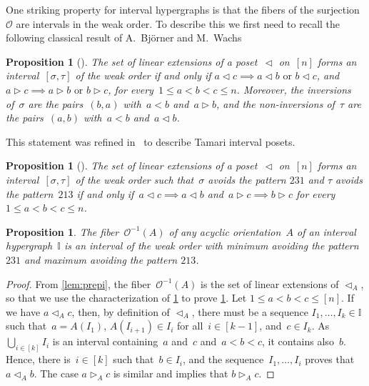 \documentclass[reqno]{amsart}
\newtheorem{proposition}[theorem]{Proposition}
\theoremstyle{definition}
\newcommand{\less}{\vartriangleleft} %
\newcommand{\more}{\vartriangleright} %
\newcommand{\Or}{\mathcal O}  %
\newcommand{\II}{\mathbb I} %
\begin{document}
One striking property for interval hypergraphs is that the fibers of the surjection~$\Or$ are intervals in the weak order.
To describe this we first need to recall the following classical result of A.~Bj\"orner and M.~Wachs~\cite[Thm.~6.8]{BjornerWachs}

\begin{proposition}[{\cite[Thm.~6.8]{BjornerWachs}}]
\label{prop:WOIP}
The set of linear extensions of a poset~$\less$ on~$[n]$ forms an interval~$[\sigma, \tau]$ of the weak order if and only if ${a \less c \implies a \less b \text{ or } b \less c}$, and~${a \more c \implies a \more b \text{ or } b \more c}$, for every~$1 \le a < b < c \le n$.
Moreover, the inversions of~$\sigma$ are the pairs~$(b,a)$ with~$a < b$ and~$a \more b$, and the non-inversions of~$\tau$ are the pairs~$(a,b)$ with~$a < b$ and~$a \less b$.
\end{proposition}

This statement was refined in~\cite{ChatelPilaudPons} to describe Tamari interval posets.

\begin{proposition}[{\cite[Coro.~2.24]{ChatelPilaudPons}}]
\label{prop:TOIP}
The set of linear extensions of a poset~$\less$ on~$[n]$ forms an interval~$[\sigma, \tau]$ of the weak order such that~$\sigma$ avoids the pattern $231$ and $\tau$ avoids the pattern~$213$ if and only if~${a \less c \implies a \less b}$ and~$a \more c \implies b \more c$ for every~$1 \le a < b < c \le n$.
\end{proposition}

\begin{proposition}
\label{prop:preimageI}
The fiber~$\Or^{-1}(A)$ of any acyclic orientation~$A$ of an interval hypergraph~$\II$ is an interval of the weak order with minimum avoiding the pattern $231$ and maximum avoiding the pattern $213$.
\end{proposition}

\begin{proof}
From \cref{lem:prepi}, the fiber~$\Or^{-1}(A)$ is the set of linear extensions of $\less_A$, so that we use the characterization of \cref{prop:TOIP} to prove \cref{prop:preimageI}.
Let $1 \le a < b < c \le [n]$.
If we have $a \less_{A} c$, then, by definition of $\less_A$, there must be a sequence $I_1, \dots, I_k \in \II$ such that~$a = A(I_1)$, $A(I_{i+1}) \in I_i$ for all~$i \in [k-1]$, and~$c \in I_k$.
As $\bigcup_{i \in [k]} I_i$ is an interval containing~$a$ and~$c$ and~$a < b < c$, it contains also~$b$.
Hence, there is~$i \in [k]$ such that~$b \in I_i$, and the sequence~$I_1, \dots, I_i$ proves that~$a \less_{A} b$.
The case $a \more_{A} c$ is similar and  implies that $b \more_A c$.
\end{proof}
\end{document}
